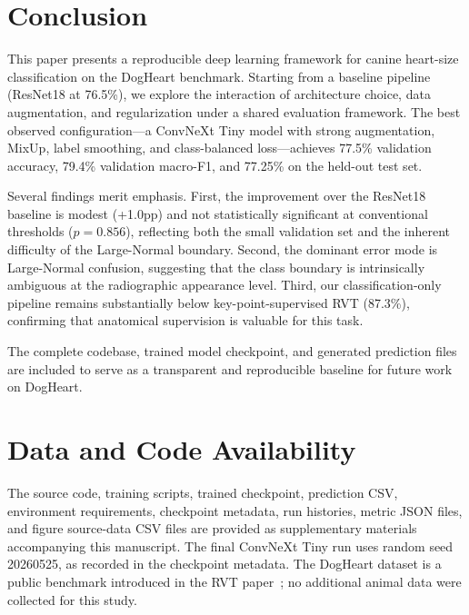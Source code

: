 \documentclass[10pt,twocolumn,letterpaper]{article}
\newcommand{\BestAccuracy}{77.5\%}
\newcommand{\BestTestAccuracy}{77.25\%}
\newcommand{\BestMacroFOne}{79.4\%}
\newcommand{\BaselineAccuracy}{76.5\%}
\newcommand{\McNemarBaselineP}{0.856}
\begin{document}
\section{Conclusion}\label{sec:conclusion}

This paper presents a reproducible deep learning framework for canine heart-size classification on the DogHeart benchmark. Starting from a baseline pipeline (ResNet18 at \BaselineAccuracy{}), we explore the interaction of architecture choice, data augmentation, and regularization under a shared evaluation framework. The best observed configuration---a ConvNeXt Tiny model with strong augmentation, MixUp, label smoothing, and class-balanced loss---achieves \BestAccuracy{} validation accuracy, \BestMacroFOne{} validation macro-F1, and \BestTestAccuracy{} on the held-out test set.

Several findings merit emphasis. First, the improvement over the ResNet18 baseline is modest (+1.0pp) and not statistically significant at conventional thresholds ($p = \McNemarBaselineP$), reflecting both the small validation set and the inherent difficulty of the Large-Normal boundary. Second, the dominant error mode is Large-Normal confusion, suggesting that the class boundary is intrinsically ambiguous at the radiographic appearance level. Third, our classification-only pipeline remains substantially below key-point-supervised RVT (87.3\%), confirming that anatomical supervision is valuable for this task.

The complete codebase, trained model checkpoint, and generated prediction files are included to serve as a transparent and reproducible baseline for future work on DogHeart.

\section*{Data and Code Availability}

The source code, training scripts, trained checkpoint, prediction CSV, environment requirements, checkpoint metadata, run histories, metric JSON files, and figure source-data CSV files are provided as supplementary materials accompanying this manuscript. The final ConvNeXt Tiny run uses random seed 20260525, as recorded in the checkpoint metadata. The DogHeart dataset is a public benchmark introduced in the RVT paper~\cite{li2024regressive}; no additional animal data were collected for this study.

{\small


}
\end{document}
